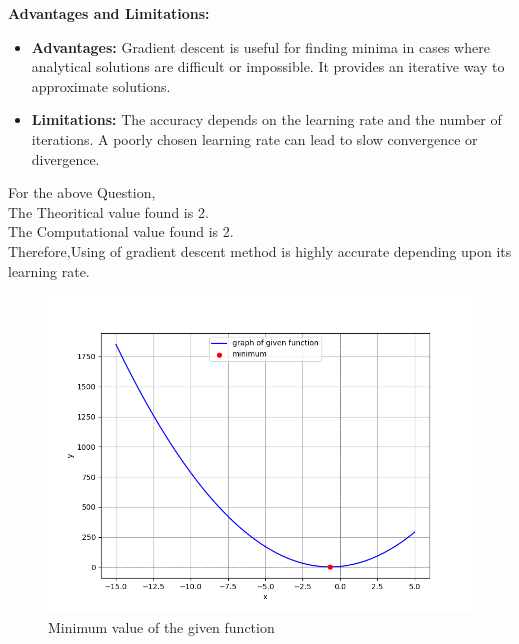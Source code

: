 \documentclass[article]{IEEEtran}
\numberwithin{figure}{enumi}
\begin{document}
\noindent\textbf{Advantages and Limitations:}
\begin{itemize}
    \item \textbf{Advantages:} Gradient descent is useful for finding minima in cases where analytical solutions are difficult or impossible. It provides an iterative way to approximate solutions.
    \item \textbf{Limitations:} The accuracy depends on the learning rate and the number of iterations. A poorly chosen learning rate can lead to slow convergence or divergence.
\end{itemize}
For the above Question,\\
The Theoritical value found is 2.\\
The Computational value found is 2.\\
Therefore,Using of gradient descent method is highly accurate depending upon its learning rate.
 \begin{figure}[h!]
	\centering
	\includegraphics[width=\columnwidth]{figures/Figure_1.png}
	 \caption{Minimum value of the given function}
	\label{stemplot}
\end{figure}
\end{document}
